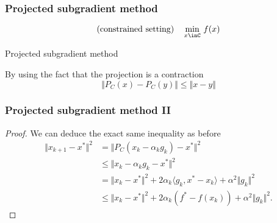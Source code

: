 \documentclass{beamer}
\begin{document}
\begin{frame}
  \frametitle{Projected subgradient method}
  \begin{equation}
    \text{(constrained setting)} \quad \min_{x\inC}\, f(x)
  \end{equation}
  \begin{algorithm}[H]
    \caption{Projected subgradient method}\label{label:}
    \begin{algorithmic}[1]
      \Endfor
    \end{algorithmic}
  \end{algorithm}
  By using the fact that the projection is a contraction
  \begin{equation}
    \Vert P_C(x) - P_C(y) \Vert \le \Vert x-y \Vert
  \end{equation}
\end{frame}

\begin{frame}
  \frametitle{Projected subgradient method II}
  \begin{proof}
    We can deduce the exact same inequality as before
    \begin{equation}
      \begin{aligned}
        \Vert x_{k+1} - x^* \Vert^2 &= \Vert P_C(x_k - \alpha_k g_k) - x^* \Vert^2 \\
        &\le \Vert x_k - \alpha_k g_k - x^* \Vert^2 \\
        &= \Vert x_k-x^* \Vert^2 + 2 \alpha_k \langle g_k, x^*-x_k \rangle + \alpha^2 \Vert g_k \Vert^2\\
        &\le \Vert x_k-x^* \Vert^2 + 2 \alpha_k (f^* - f(x_k))+ \alpha^2 \Vert g_k \Vert^2.
      \end{aligned}
    \end{equation}
  \end{proof}

\end{frame}




\end{document}
